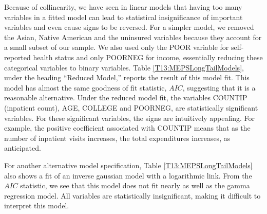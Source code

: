 Because of collinearity, we have seen in linear models that having
too many variables in a fitted model can lead to statistical
insignificance of important variables and even cause signs to be
reversed. For a simpler model, we removed the Asian, Native American
and the uninsured variables because they account for a small subset
of our sample. We also used only the POOR variable for self-reported
health status and only POORNEG for income, essentially reducing
these categorical variables to binary variables. Table
\ref{T13:MEPSLongTailModels}, under the heading ``Reduced Model,''
reports the result of this model fit. This model has almost the same
goodness of fit statistic, $AIC$, suggesting that it is a reasonable
alternative. Under the reduced model fit, the variables COUNTIP
(inpatient count), AGE, COLLEGE and POORNEG, are statistically
significant variables. For these significant variables, the signs
are intuitively appealing. For example, the positive coefficient
associated with COUNTIP means that as the number of inpatient visits
increases, the total expenditures increases, as anticipated.

For another alternative model specification, Table
\ref{T13:MEPSLongTailModels} also shows a fit of an inverse gaussian
model with a logarithmic link. From the $AIC$ statistic, we see that
this model does not fit nearly as well as the gamma regression
model. All variables are statistically insignificant, making it
difficult to interpret this model.




